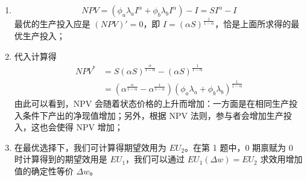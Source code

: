 \begin{solution}
\begin{enumerate}[label=(\alph*)]
\[    \]
    消费侧一阶条件：$1/c_{0}=\lambda$，$\pi_{\omega}/c_{\omega}=\lambda\phi_{\omega}$。代入预算并注意 $\pi_{a}+\pi_{b}=1$，得 $c_{0}^{*}=w^{*}/2$，$c_{\omega}^{*}=\pi_{\omega}w^{*}/(2\phi_{\omega})$，其中 $w^{*}=SI^{*\alpha}-I^{*}$。再用 $c_{a}$、$c_{b}$ 反解股票头寸，得到
    \[
        I^{*}=(\alpha S)^{\frac{1}{1-\alpha}},\quad w^{*}=SI^{*\alpha}-I^{*},\quad c_{0}^{*}=\tfrac12 w^{*},\quad\theta_{S}^{*}=\frac{\frac{\pi_{a}}{2\phi_{a}}-\frac{\pi_{b}}{2\phi_{b}}}{\lambda_{a}-\lambda_{b}}w^{*}-I^{*\alpha}
    \]
    另外，参与者须在 0 期卖空 $\theta_{S}^{*}S+c_{0}^{*}+I^{*}$ 单位的无风险债券；
    \item
    \[
        NPV=(\phi_{a}\lambda_{a}I^{\alpha}+\phi_{b}\lambda_{b}I^{\alpha})-I=SI^{\alpha}-I
    \]
    最优的生产投入应是 $(NPV)'=0$，即 $I=(\alpha S)^{\frac{1}{1-\alpha}}$，恰是上面所求得的最优生产投入；
    \item 代入计算得
    \[
        \begin{aligned}
            NPV^{*}&=S(\alpha S)^{\frac{\alpha}{1-\alpha}}-(\alpha S)^{\frac{1}{1-\alpha}}\\
            &=(\alpha^{\frac{\alpha}{1-\alpha}}-\alpha^{\frac{1}{1-\alpha}})(\phi_{a}\lambda_{a}+\phi_{b}\lambda_{b})^{\frac{1}{1-\alpha}}
        \end{aligned}
    \]
    由此可以看到，NPV 会随着状态价格的上升而增加：一方面是在相同生产投入条件下产出的净现值增加；另外，根据 NPV 法则，参与者会增加生产投入，这也会使得 NPV 增加；
    \item 在最优选择下，我们可计算得期望效用为 $EU_{2}$。在第 1 题中，0 期禀赋为 0 时计算得到的期望效用是 $EU_{1}$，我们可以通过 $EU_{1}(\Delta w)=EU_{2}$ 求效用增加值的确定性等价 $\Delta w$。
\end{enumerate}
\end{solution}

